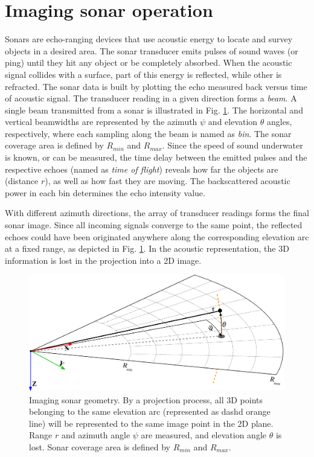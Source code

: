 \documentclass[final,5p,times]{elsarticle}
\begin{document}
\section{Imaging sonar operation}
\label{sonar:operation}

Sonars are echo-ranging devices that use acoustic energy to locate and survey
objects in a desired area. The sonar transducer emits pulses of sound waves
(or ping) until they hit any object or be completely absorbed. When the
acoustic signal collides with a surface, part of this energy is reflected,
while other is refracted. The sonar data is built by plotting the echo measured back versus time of acoustic signal. The transducer reading in a given direction forms a \textit{beam}. A single beam transmitted from a sonar is illustrated in Fig. \ref{fig:sonar_geometry}. The horizontal and vertical beamwidths are represented by the azimuth $\psi$ and elevation $\theta$ angles, respectively, where each sampling along the beam is named as \textit{bin}. The sonar coverage area is defined by $R_{min}$ and $R_{max}$. Since the speed of sound underwater is known, or can be measured, the time delay between the emitted pulses and the respective echoes (named as \textit{time of flight}) reveals how far the objects are (distance $r$), as well as how fast they are moving. The backscattered acoustic power in each bin determines the echo intensity value.

With different azimuth directions, the array of transducer readings forms the
final sonar image. Since all incoming signals converge to the same point, the
reflected echoes could have been originated anywhere along the corresponding
elevation arc at a fixed range, as depicted in Fig. \ref{fig:sonar_geometry}.
In the acoustic representation, the 3D information is lost in the projection
into a 2D image.

\begin{figure}[t]
    \includegraphics[width=\columnwidth]{figs/sonar_geometry_2}
    \captionsetup{justification=justified}
    \caption{Imaging sonar geometry. By a projection process, all 3D points  belonging to the same elevation arc (represented as dashd orange line) will be represented to the same image point in the 2D plane. Range $r$ and azimuth angle $\psi$ are measured, and elevation angle $\theta$ is lost. Sonar coverage area is defined by $R_{min}$ and $R_{max}$.}
    \label{fig:sonar_geometry}
\end{figure}
\end{document}
